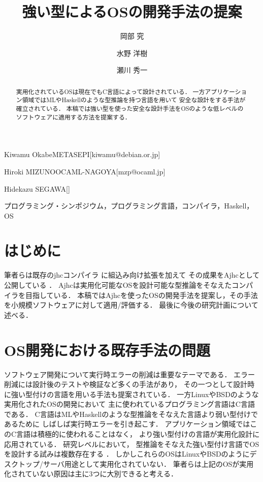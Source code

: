\documentclass[submit,techreq,noauthor]{ipsj}
\begin{document}
\title{強い型によるOSの開発手法の提案}


\author{岡部 究}{Kiwamu Okabe}{METASEPI}[kiwamu@debian.or.jp]
\author{水野 洋樹}{Hiroki MIZUNO}{OCAML-NAGOYA}[mzp@ocaml.jp]
\author{瀬川 秀一}{Hidekazu SEGAWA}{}[]

\begin{abstract}
実用化されているOSは現在でもC言語によって設計されている．
一方アプリケーション領域ではMLやHaskellのような型推論を持つ言語を用いて
安全な設計をする手法が確立されている．
本稿では強い型を使った安全な設計手法をOSのような低レベルのソフトウェアに適用する方法を提案する．
\end{abstract}

\begin{jkeyword}
プログラミング・シンポジウム，プログラミング言語，コンパイラ，Haskell，OS
\end{jkeyword}

\maketitle

\section{はじめに}

筆者らは既存のjhcコンパイラ \cite{jhc}
に組込み向け拡張を加えて \cite{j-ikamusume5}
その成果をAjhcとして公開している \cite{ajhc} ．
Ajhcは実用化可能なOSを設計可能な型推論をそなえたコンパイラを目指している．
本稿ではAjhcを使ったOSの開発手法を提案し，その手法を小規模ソフトウェアに対して適用/評価する．
最後に今後の研究計画について述べる．

\section{OS開発における既存手法の問題}

ソフトウェア開発について実行時エラーの削減は重要なテーマである．
エラー削減には設計後のテストや検証など多くの手法があり，
その一つとして設計時に強い型付けの言語を用いる手法も提案されている．
一方LinuxやBSDのような実用化されたOSの開発において
主に使われているプログラミング言語はC言語である．
C言語はMLやHaskellのような型推論をそなえた言語より弱い型付けであるために
しばしば実行時エラーを引き起こす．
アプリケーション領域ではこのC言語は積極的に使われることはなく，
より強い型付けの言語が実用化設計に応用されている．
研究レベルにおいて，
型推論をそなえた強い型付け言語でOSを設計する試みは複数存在する
\cite{funk} \cite{snowflake-os} \cite{house} ．
しかしこれらのOSはLinuxやBSDのようにデスクトップ/サーバ用途として実用化されていない．
筆者らは上記のOSが実用化されていない原因は主に3つに大別できると考える．
\end{document}
